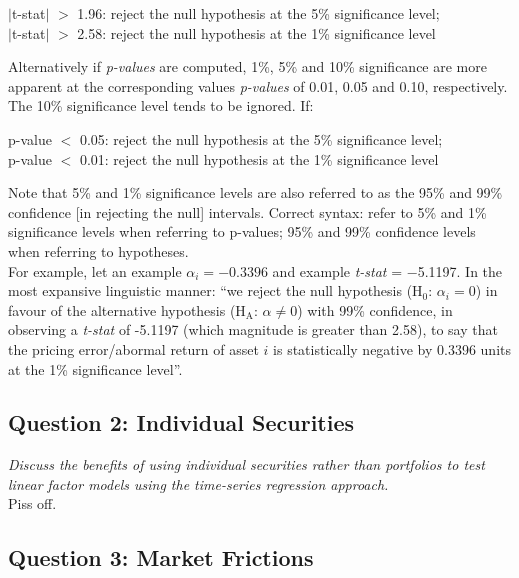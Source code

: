 \documentclass[11pt, english]{article}
\begin{document}
	\begin{center}
	$|$t-stat$|$ $>$ 1.96: reject the null hypothesis at the 5\% significance level;\\
	$|$t-stat$|$ $>$ 2.58: reject the null hypothesis at the 1\% significance level
	\end{center}

	Alternatively if \textit{p-values} are computed, 1\%, 5\% and 10\% significance are more apparent at the corresponding values \textit{p-values} of 0.01, 0.05 and 0.10, respectively. The 10\% significance level tends to be ignored. If:

	\begin{center}
	p-value $<$ 0.05: reject the null hypothesis at the 5\% significance level;\\
	p-value $<$ 0.01: reject the null hypothesis at the 1\% significance level
	\end{center}

	Note that 5\% and 1\% significance levels are also referred to as the 95\% and 99\% confidence [in rejecting the null] intervals. Correct syntax: refer to 5\% and 1\% significance levels when referring to p-values; 95\% and 99\% confidence levels when referring to hypotheses.\\

	For example, let an example $\alpha_i=-0.3396$ and example \textit{t-stat} = $-$5.1197. In the most expansive linguistic manner: ``we reject the null hypothesis (H$_0$: $\alpha_i=0$) in favour of the alternative hypothesis (H$\mathrm{_A}$: $\alpha\neq0$) with 99\% confidence, in observing a \textit{t-stat} of -5.1197 (which magnitude is greater than 2.58), to say that the pricing error/abormal return of asset $i$ is statistically negative by 0.3396 units at the 1\% significance level''.

	\newpage

	\subsection{Question 2: Individual Securities}

	\textit{Discuss the benefits of using individual securities rather than portfolios to test linear factor models using the time-series regression approach.}\\

	Piss off.

	\newpage

	\subsection{Question 3: Market Frictions}
        
\end{document}
